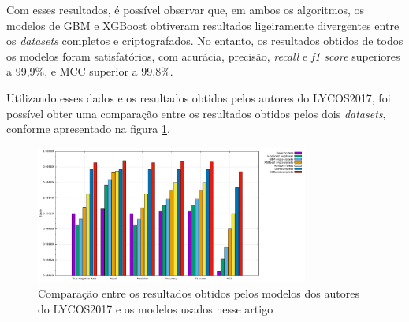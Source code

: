 \documentclass[12pt]{article}
\begin{document}
\begin{table}[h!]
    \caption{Resultados obtidos dos modelos}
    \label{tab:resultados}
\end{table}

Com esses resultados, é possível observar que, em ambos os algoritmos, os modelos de GBM e XGBoost obtiveram resultados ligeiramente divergentes entre os \emph{datasets} completos e criptografados. No entanto, os resultados obtidos de todos os modelos foram satisfatórios, com acurácia, precisão, \emph{recall} e \emph{f1 score} superiores a 99,9\%, e MCC superior a 99,8\%.

Utilizando esses dados e os resultados obtidos pelos autores do LYCOS2017, foi possível obter uma comparação entre os resultados obtidos pelos dois \emph{datasets}, conforme apresentado na figura \ref{fig:model_comparison}.

\begin{figure}[h!]
    \centering
    \includegraphics[width=0.8\textwidth]{figures/model_comparison.pdf}
    \caption{Comparação entre os resultados obtidos pelos modelos dos autores do LYCOS2017 e os modelos usados nesse artigo}
    \label{fig:model_comparison}
\end{figure}
\end{document}
